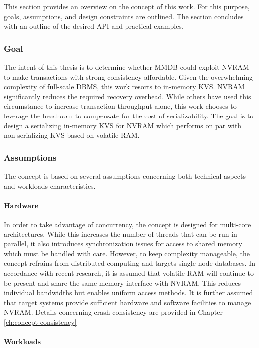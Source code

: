 This section provides an overview on the concept of this work. For this purpose,
goals, assumptions, and design constraints are outlined. The section concludes
with an outline of the desired API and practical examples.

\subsubsection{Goal}

The intent of this thesis is to determine whether MMDB could exploit NVRAM to
make transactions with strong consistency affordable. Given the overwhelming
complexity of full-scale DBMS, this work resorts to in-memory KVS. NVRAM
significantly reduces the required recovery overhead. While others have used
this circumstance to increase transaction throughput alone, this work chooses to
leverage the headroom to compensate for the cost of serializability. The goal is
to design a serializing in-memory KVS for NVRAM which performs on par with
non-serializing KVS based on volatile RAM.

\subsubsection{Assumptions}

The concept is based on several assumptions concerning both technical aspects
and workloads characteristics.

\paragraph{Hardware}

In order to take advantage of concurrency, the concept is designed for
multi-core architectures. While this increases the number of threads that can be
run in parallel, it also introduces synchronization issues for access to shared
memory which must be handled with care. However, to keep complexity manageable,
the concept refrains from distributed computing and targets single-node
databases. In accordance with recent research, it is assumed that volatile RAM
will continue to be present and share the same memory interface with NVRAM. This
reduces individual bandwidths but enables uniform access methods. It is further
assumed that target systems provide sufficient hardware and software facilities
to manage NVRAM. Details concerning crash consistency are provided in Chapter
\ref{ch:concept-consistency}

\paragraph{Workloads}

